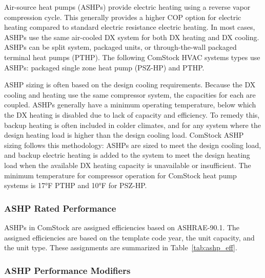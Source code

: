Air-source heat pumps (ASHPs) provide electric heating using a reverse vapor compression cycle. This generally provides a higher COP option for electric heating compared to standard electric resistance electric heating. In most cases, ASHPs use the same air-cooled DX system for both DX heating and DX cooling. ASHPs can be split system, packaged units, or through-the-wall packaged terminal heat pumps (PTHP). The following ComStock HVAC systems types use ASHPs: packaged single zone heat pump (PSZ-HP) and PTHP.

ASHP sizing is often based on the design cooling requirements. Because the DX cooling and heating use the same compressor system, the capacities for each are coupled. ASHPs generally have a minimum operating temperature, below which the DX heating is disabled due to lack of capacity and efficiency. To remedy this, backup heating is often included in colder climates, and for any system where the design heating load is higher than the design cooling load. ComStock ASHP sizing follows this methodology: ASHPs are sized to meet the design cooling load, and backup electric heating is added to the system to meet the design heating load when the available DX heating capacity is unavailable or insufficient. The minimum temperature for compressor operation for ComStock heat pump systems is 17°F PTHP and 10°F for PSZ-HP.


\subsubsection{ASHP Rated Performance}

ASHPs in ComStock are assigned efficiencies based on ASHRAE-90.1. The assigned efficiencies are based on the template code year, the unit capacity, and the unit type. These assignments are summarized in Table~\ref{tab:ashp_eff}.

\subsubsection{ASHP Performance Modifiers}

